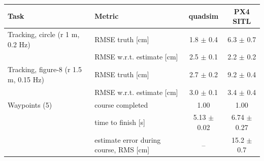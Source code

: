 \begin{tabular}{llcc}\toprule
Task & Metric & quadsim & PX4 SITL\\\midrule
Tracking, circle (r 1 m, 0.2 Hz) & RMSE truth [cm] & 1.8 $\pm$ 0.4 & 6.3 $\pm$ 0.7\\
 & RMSE w.r.t. estimate [cm] & 2.5 $\pm$ 0.1 & 2.2 $\pm$ 0.2\\
Tracking, figure-8 (r 1.5 m, 0.15 Hz) & RMSE truth [cm] & 2.7 $\pm$ 0.2 & 9.2 $\pm$ 0.4\\
 & RMSE w.r.t. estimate [cm] & 3.0 $\pm$ 0.1 & 3.4 $\pm$ 0.4\\
Waypoints (5) & course completed & 1.00 & 1.00\\
 & time to finish [s] & 5.13 $\pm$ 0.02 & 6.74 $\pm$ 0.27\\
 & estimate error during course, RMS [cm] & -- & 15.2 $\pm$ 0.7\\
\bottomrule\end{tabular}
